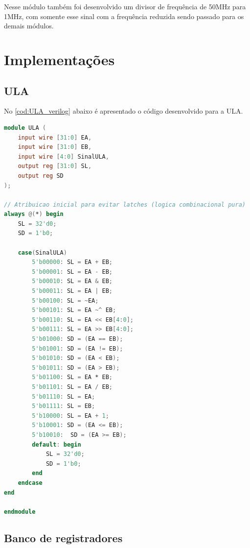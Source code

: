 \documentclass[
	12pt,				%
	oneside,
	a4paper,			%
	english,			%
	french,				%
	spanish,			%
	brazil,				%
	]{abntex2}
\begin{document}
Nesse módulo também foi desenvolvido um divisor de frequência de 50MHz para 1MHz, com somente esse sinal com a frequência reduzida sendo passado para os demais módulos.


\section{Implementações}

\subsection{ULA}

No \autoref{cod:ULA_verilog} abaixo é apresentado o código desenvolvido para a ULA.

\begin{lstlisting}[language=Verilog, caption={Módulo da ULA em Verilog}, label={cod:ULA_verilog}]
module ULA (
    input wire [31:0] EA,
    input wire [31:0] EB,
    input wire [4:0] SinalULA,
    output reg [31:0] SL,
    output reg SD
);

// Atribuicao inicial para evitar latches (logica combinacional pura)
always @(*) begin
    SL = 32'd0;
    SD = 1'b0;

    case(SinalULA)
        5'b00000: SL = EA + EB;
        5'b00001: SL = EA - EB;
        5'b00010: SL = EA & EB;
        5'b00011: SL = EA | EB;
        5'b00100: SL = ~EA;
        5'b00101: SL = EA ~^ EB;
        5'b00110: SL = EA << EB[4:0];
        5'b00111: SL = EA >> EB[4:0];
        5'b01000: SD = (EA == EB);
        5'b01001: SD = (EA != EB);
        5'b01010: SD = (EA < EB);
        5'b01011: SD = (EA > EB);
        5'b01100: SL = EA * EB;
        5'b01101: SL = EA / EB;
        5'b01110: SL = EA;
        5'b01111: SL = EB;
        5'b10000: SL = EA + 1;
        5'b10001: SD = (EA <= EB);
        5'b10010:  SD = (EA >= EB);
        default: begin
            SL = 32'd0;
            SD = 1'b0;
        end
    endcase
end

endmodule

\end{lstlisting}

\newpage

\subsection{Banco de registradores}
\end{document}
